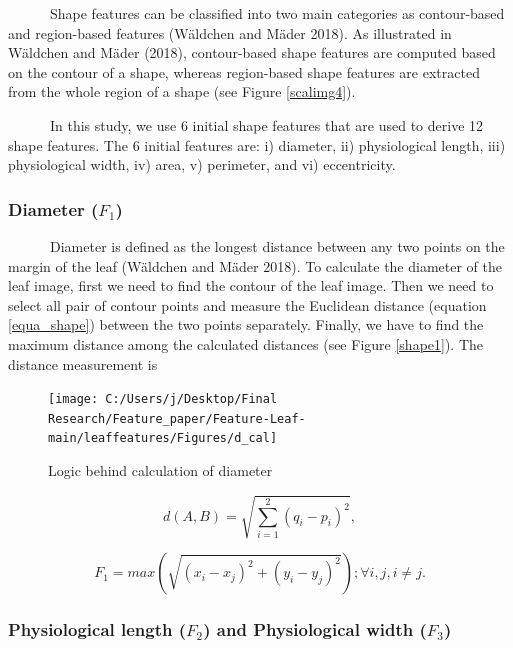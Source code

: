 \documentclass{article}
\begin{document}
~~~~~~Shape features can be classified into two main categories as
contour-based and region-based features (Wäldchen and Mäder 2018). As
illustrated in Wäldchen and Mäder (2018), contour-based shape features
are computed based on the contour of a shape, whereas region-based shape
features are extracted from the whole region of a shape (see Figure
\ref{scalimg4}).

~~~~~~In this study, we use 6 initial shape features that are used to
derive 12 shape features. The 6 initial features are: i) diameter, ii)
physiological length, iii) physiological width, iv) area, v) perimeter,
and vi) eccentricity.

\hypertarget{diameter-f_1}{%
\subsubsection{\texorpdfstring{Diameter
(\(F_1\))}{Diameter (F\_1)}}\label{diameter-f_1}}

~~~~~~Diameter is defined as the longest distance between any two points
on the margin of the leaf (Wäldchen and Mäder 2018). To calculate the
diameter of the leaf image, first we need to find the contour of the
leaf image. Then we need to select all pair of contour points and
measure the Euclidean distance (equation \ref{equa_shape}) between the
two points separately. Finally, we have to find the maximum distance
among the calculated distances (see Figure \ref{shape1}). The distance
measurement is

\begin{figure}[!ht]

{\centering \texttt{[image: C:/Users/j/Desktop/Final Research/Feature\_paper/Feature-Leaf-main/leaffeatures/Figures/d\_cal]} 

}

\caption{\label{shape1}Logic behind calculation of diameter}\label{fig:unnamed-chunk-14}
\end{figure}

\begin{equation}
    d\left( A,B\right)   = \sqrt {\sum _{i=1}^{2}  \left( q_{i}-p_{i}\right)^2},
\label{equa_shape}
\end{equation}

\begin{equation}
   F_1 = max(\sqrt{(x_i-x_j)^2 + (y_i-y_j)^2}); \forall i,j, i \neq j.
\label{equa_F1}
\end{equation}

\hypertarget{physiological-length-f_2-and-physiological-width-f_3}{%
\subsubsection{\texorpdfstring{Physiological length (\(F_2\)) and
Physiological width
(\(F_3\))}{Physiological length (F\_2) and Physiological width (F\_3)}}\label{physiological-length-f_2-and-physiological-width-f_3}}
\end{document}
